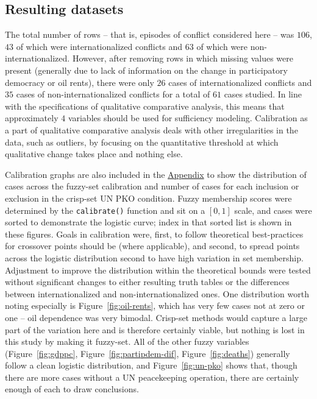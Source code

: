 \documentclass{article}
\begin{document}
\subsection{Resulting datasets}
The total number of rows -- that is, episodes of conflict considered here -- was $106$, $43$ of which were internationalized conflicts and $63$ of which were non-internationalized. However, after removing rows in which missing values were present (generally due to lack of information on the change in participatory democracy or oil rents), there were only $26$ cases of internationalized conflicts and $35$ cases of non-internationalized conflicts for a total of $61$ cases studied. In line with the specifications of qualitative comparative analysis, this means that approximately $4$ variables should be used for sufficiency modeling. Calibration as a part of qualitative comparative analysis deals with other irregularities in the data, such as outliers, by focusing on the quantitative threshold at which qualitative change takes place and nothing else.

Calibration graphs are also included in the \hyperref[appendix]{Appendix} to show the distribution of cases across the fuzzy-set calibration and number of cases for each inclusion or exclusion in the crisp-set UN PKO condition. Fuzzy membership scores were determined by the \texttt{calibrate()} function and sit on a $[0,1]$ scale, and cases were sorted to demonstrate the logistic curve; index in that sorted list is shown in these figures. Goals in calibration were, first, to follow theoretical best-practices for crossover points should be (where applicable), and second, to spread points across the logistic distribution second to have high variation in set membership. Adjustment to improve the distribution within the theoretical bounds were tested without significant changes to either resulting truth tables or the differences between internationalized and non-internationalized ones. One distribution worth noting especially is Figure~\ref{fig:oil-rents}, which has very few cases not at zero or one -- oil dependence was very bimodal. Crisp-set methods would capture a large part of the variation here and is therefore certainly viable, but nothing is lost in this study by making it fuzzy-set. All of the other fuzzy variables (Figure~\ref{fig:gdppc}, Figure~\ref{fig:partipdem-dif}, Figure~\ref{fig:deaths}) generally follow a clean logistic distribution, and Figure~\ref{fig:un-pko} shows that, though there are more cases without a UN peacekeeping operation, there are certainly enough of each to draw conclusions.
\end{document}
